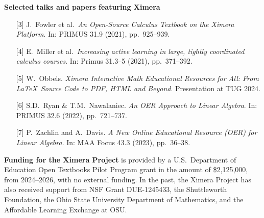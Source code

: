 \documentclass[twocolumn]{article}
\makeatletter
\newcommand{\mylabel}[2]{#2\def\@currentlabel{#2}\label{#1}}
\makeatother
\begin{document}
\begin{xframe}
    {\sffamily\bfseries Selected talks and papers featuring Ximera}
    \begin{itemize}
        \item[\mylabel{F21}{[3]}] J.\ Fowler et al.\ \textit{An Open-Source
            Calculus Textbook on the Ximera Platform}. In:
        PRIMUS 31.9 (2021), pp.\ 925--939. %
        \item[{[4]}] E.\ Miller et al.\ \textit{Increasing active learning in
            large, tightly coordinated calculus courses}. In: Primus 31.3--5
        (2021), pp.\
        371--392.
        \item[{[5]}] W.\ Obbels. \textit{Ximera Interactive Math Educational
            Resources for All: From \LaTeX\ Source Code to PDF, HTML and Beyond}. 
            Presentation at TUG 2024.
        \item[{[6]}]S.D.\ Ryan \& T.M.\ Nawalaniec. \textit{An OER Approach to
            Linear Algebra}. In: PRIMUS 32.6 (2022), pp.\ 721--737.
        \item[{[7]}] P.\ Zachlin and A.\ Davis. \textit{A New Online
            Educational Resource (OER)
            for Linear Algebra}. In: MAA Focus 43.3 (2023), pp.\ 36--38.
    \end{itemize}
\end{xframe}
\begin{xframe}
    \textbf{Funding for the Ximera Project} is provided by
    a U.S.\ Department of Education Open Textbooks Pilot Program grant in the
    amount of \$2,125,000, from 2024--2026, with no external funding. In the
    past, the Ximera Project has
    also received support from NSF Grant DUE-1245433, the Shuttleworth
    Foundation, the Ohio State University
    Department of Mathematics, and the Affordable Learning Exchange at OSU.
\end{xframe}
\vfill
\break
\end{document}
